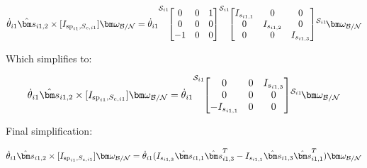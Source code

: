 \begin{equation}
	\dot{\theta}_{i1} \hat{\bm s}_{i1,2} \times [I_{\text{sp}_{i1},S_{c,i1}}]\bm \omega_{\cal{B/N}} = \dot{\theta}_{i1} {\vphantom{\begin{bmatrix}
				0 & 0 & 1 \\
				0 & 0 & 0 \\
				-1 & 0 & 0
	\end{bmatrix}}}^{\mathcal{S}_{i1}\!}{\begin{bmatrix}
			0 & 0 & 1 \\
			0 & 0 & 0 \\
			-1 & 0 & 0
	\end{bmatrix}} {\vphantom{\begin{bmatrix}
				I_{s_{i1,1}} & 0 & 0 \\
				0 & I_{s_{i1,2}} & 0 \\
				0 & 0 & I_{s_{i1,3}}
	\end{bmatrix}}}^{\mathcal{S}_{i1}\!}{\begin{bmatrix}
			I_{s_{i1,1}} & 0 & 0 \\
			0 & I_{s_{i1,2}} & 0 \\
			0 & 0 & I_{s_{i1,3}}
	\end{bmatrix}} {\vphantom{\bm \omega_{\cal{B/N}}}}^{\mathcal{S}_{i1}\!}{\bm \omega_{\cal{B/N}}}
\end{equation}

Which simplifies to:

\begin{equation}
	\dot{\theta}_{i1} \hat{\bm s}_{i1,2} \times [I_{\text{sp}_{i1},S_{c,i1}}]\bm \omega_{\cal{B/N}} = \dot{\theta}_{i1} {\vphantom{\begin{bmatrix}
				0 & 0 & I_{s_{i1,3}} \\
				0 & 0 & 0 \\
				-I_{s_{i1,1}} & 0 & 0
	\end{bmatrix}}}^{\mathcal{S}_{i1}\!}{\begin{bmatrix}
			0 & 0 & I_{s_{i1,3}} \\
			0 & 0 & 0 \\
			-I_{s_{i1,1}} & 0 & 0
	\end{bmatrix}} {\vphantom{\bm \omega_{\cal{B/N}}}}^{\mathcal{S}_{i1}\!}{\bm \omega_{\cal{B/N}}}
\end{equation}

Final simplification:

\begin{equation}
	\dot{\theta}_{i1} \hat{\bm s}_{i1,2} \times [I_{\text{sp}_{i1},S_{c,i1}}]\bm \omega_{\cal{B/N}} = \dot{\theta}_{i1} (I_{s_{i1,3}} \hat{\bm s}_{i1,1} \hat{\bm s}_{i1,3}^T - I_{s_{i1,1}} \hat{\bm s}_{i1,3} \hat{\bm s}_{i1,1}^T) \bm \omega_{\cal{B/N}}
\end{equation}

